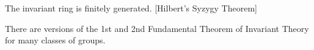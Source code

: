 
\begin{thm}
The invariant ring is finitely generated. [Hilbert's Syzygy Theorem]
\end{thm}


There are versions of the 1st and 2nd Fundamental Theorem of Invariant Theory for many classes of groups.
























